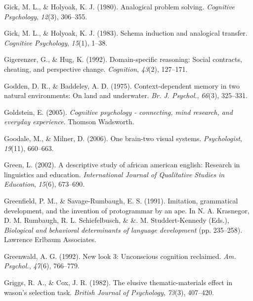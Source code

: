 \documentclass[
]{krantz}
\newlength{\cslhangindent}
\newlength{\cslentryspacingunit} %
\newenvironment{CSLReferences}[2] %
 {%
  \setlength{\parindent}{0pt}
  \ifodd #1
  \let\oldpar\par
  \def\par{\hangindent=\cslhangindent\oldpar}
  \fi
  \setlength{\parskip}{#2\cslentryspacingunit}
 }%
 {}
\begin{document}
\begin{CSLReferences}{1}{0}
\leavevmode{}%
Gick, M. L., \& Holyoak, K. J. (1980). Analogical problem solving. \emph{Cognitive Psychology}, \emph{12}(3), 306--355.

\leavevmode{}%
Gick, M. L., \& Holyoak, K. J. (1983). Schema induction and analogical transfer. \emph{Cognitive Psychology}, \emph{15}(1), 1--38.

\leavevmode{}%
Gigerenzer, G., \& Hug, K. (1992). Domain-specific reasoning: Social contracts, cheating, and perspective change. \emph{Cognition}, \emph{43}(2), 127--171.

\leavevmode{}%
Godden, D. R., \& Baddeley, A. D. (1975). Context-dependent memory in two natural environments: On land and underwater. \emph{Br. J. Psychol.}, \emph{66}(3), 325--331.

\leavevmode{}%
Goldstein, E. (2005). \emph{Cognitive psychology - connecting, mind research, and everyday experience}. Thomson Wadsworth.

\leavevmode{}%
Goodale, M., \& Milner, D. (2006). One brain-two visual systems. \emph{Psychologist}, \emph{19}(11), 660--663.

\leavevmode{}%
Green, L. (2002). A descriptive study of african american english: Research in linguistics and education. \emph{International Journal of Qualitative Studies in Education}, \emph{15}(6), 673--690.

\leavevmode{}%
Greenfield, P. M., \& Savage-Rumbaugh, E. S. (1991). Imitation, grammatical development, and the invention of protogrammar by an ape. In N. A. Krasnegor, D. M. Rumbaugh, R. L. Schiefelbusch, \& \&. M. Studdert-Kennedy (Eds.), \emph{Biological and behavioral determinants of language development} (pp. 235--258). Lawrence Erlbaum Associates.

\leavevmode{}%
Greenwald, A. G. (1992). New look 3: Unconscious cognition reclaimed. \emph{Am. Psychol.}, \emph{47}(6), 766--779.

\leavevmode{}%
Griggs, R. A., \& Cox, J. R. (1982). The elusive thematic-materials effect in wason's selection task. \emph{British Journal of Psychology}, \emph{73}(3), 407--420.


\end{CSLReferences}
\end{document}
